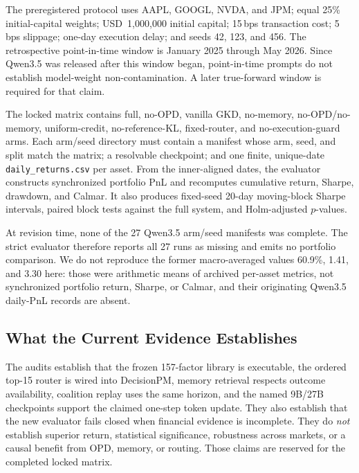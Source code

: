 The preregistered protocol uses AAPL, GOOGL, NVDA, and JPM; equal 25\% initial-capital weights; USD~1{,}000{,}000 initial capital; 15\,bps transaction cost; 5\,bps slippage; one-day execution delay; and seeds 42, 123, and 456. The retrospective point-in-time window is January 2025 through May 2026. Since Qwen3.5 was released after this window began, point-in-time prompts do not establish model-weight non-contamination. A later true-forward window is required for that claim.

The locked matrix contains full, no-OPD, vanilla GKD, no-memory, no-OPD/no-memory, uniform-credit, no-reference-KL, fixed-router, and no-execution-guard arms. Each arm/seed directory must contain a manifest whose arm, seed, and split match the matrix; a resolvable checkpoint; and one finite, unique-date \texttt{daily\_returns.csv} per asset. From the inner-aligned dates, the evaluator constructs synchronized portfolio PnL and recomputes cumulative return, Sharpe, drawdown, and Calmar. It also produces fixed-seed 20-day moving-block Sharpe intervals, paired block tests against the full system, and Holm-adjusted $p$-values.

At revision time, none of the 27 Qwen3.5 arm/seed manifests was complete. The strict evaluator therefore reports all 27 runs as missing and emits no portfolio comparison. We do not reproduce the former macro-averaged values 60.9\%, 1.41, and 3.30 here: those were arithmetic means of archived per-asset metrics, not synchronized portfolio return, Sharpe, or Calmar, and their originating Qwen3.5 daily-PnL records are absent.

\subsection{What the Current Evidence Establishes}

The audits establish that the frozen 157-factor library is executable, the ordered top-15 router is wired into DecisionPM, memory retrieval respects outcome availability, coalition replay uses the same horizon, and the named 9B/27B checkpoints support the claimed one-step token update. They also establish that the new evaluator fails closed when financial evidence is incomplete. They do \emph{not} establish superior return, statistical significance, robustness across markets, or a causal benefit from OPD, memory, or routing. Those claims are reserved for the completed locked matrix.
